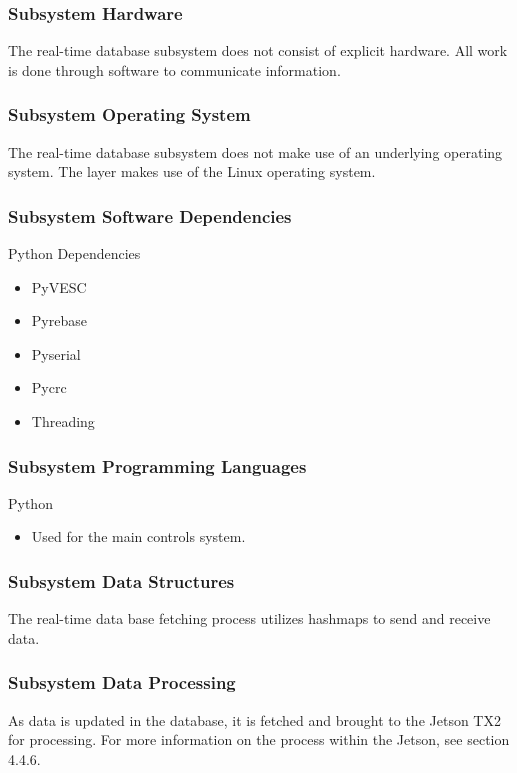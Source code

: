 \subsubsection{Subsystem Hardware}
The real-time database subsystem does not consist of explicit hardware. All work is done through software to communicate information.

\subsubsection{Subsystem Operating System}
The real-time database subsystem does not make use of an underlying operating system. The layer makes use of the Linux operating system.

\subsubsection{Subsystem Software Dependencies}
Python Dependencies
\begin{itemize}
    \item PyVESC
    \item Pyrebase
    \item Pyserial
    \item Pycrc
    \item Threading
\end{itemize}

\subsubsection{Subsystem Programming Languages}
Python
\begin{itemize}
    \item Used for the main controls system.
\end{itemize}

\subsubsection{Subsystem Data Structures}
The real-time data base fetching process utilizes hashmaps to send and receive data. 

\subsubsection{Subsystem Data Processing}
As data is updated in the database, it is fetched and brought to the Jetson TX2 for processing. For more information on the process within the Jetson, see section 4.4.6.
